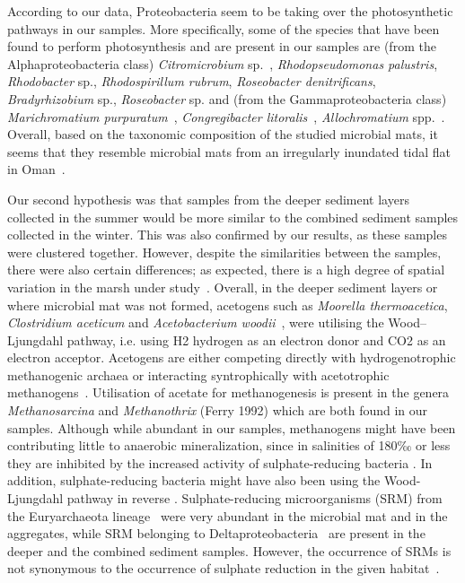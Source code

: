    According to our data, Proteobacteria seem to be taking over the photosynthetic pathways in our samples. 
   More specifically, some of the species that have been found to perform photosynthesis and are present in our samples are
   (from the Alphaproteobacteria class) \textit{Citromicrobium} sp.~\citep{jiao_coexistence_2010}, 
   \textit{Rhodopseudomonas palustris}, \textit{Rhodobacter} sp., \textit{Rhodospirillum rubrum}, 
   \textit{Roseobacter denitrificans}, \textit{Bradyrhizobium} sp., \textit{Roseobacter} sp. 
   \citep{larimer_complete_2004, bryant_prokaryotic_2006}
   and (from the Gammaproteobacteria class) 
   \textit{Marichromatium purpuratum}~\citep{shiung_photosynthetic_2018}, 
   \textit{Congregibacter litoralis}~\citep{fuchs_characterization_2007, spring_photosynthetic_2009}, 
   \textit{Allochromatium} spp.~\citep{kyndt_genome_2020}. 
   Overall, based on the taxonomic composition of the studied microbial mats, 
   it seems that they resemble microbial mats from an irregularly inundated tidal flat in Oman~\citep{meier_limitation_2021}.


   Our second hypothesis was that samples from the deeper sediment layers collected in the summer would be more similar to 
   the combined sediment samples collected in the winter. 
   This was also confirmed by our results, as these samples were clustered together. 
   However, despite the similarities between the samples, there were also certain differences; 
   as expected, there is a high degree of spatial variation in the marsh under study~\citep{dillon_spatial_2009}. 
   Overall, in the deeper sediment layers or where microbial mat was not formed, acetogens such as 
   \textit{Moorella thermoacetica}, \textit{Clostridium aceticum} and \textit{Acetobacterium woodii}~\citep{schuchmann_energetics_2016}, 
   were utilising the Wood–Ljungdahl pathway, i.e. using H2 hydrogen as an electron donor and CO2 as an electron acceptor. 
   Acetogens are either competing directly with hydrogenotrophic methanogenic archaea or interacting syntrophically 
   with acetotrophic methanogens~\citep{ragsdale_acetogenesis_2008}. 
   Utilisation of acetate for methanogenesis is present in the genera \textit{Methanosarcina} and \textit{Methanothrix} (Ferry 1992) 
   which are both found in our samples. 
   Although while abundant in our samples, methanogens might have been contributing little to anaerobic mineralization, 
   since in salinities of 180‰ or less they are inhibited by the increased activity of sulphate-reducing bacteria 
   \citep{sorensen_salinity_2004}. 
   In addition, sulphate-reducing bacteria might have also been using the Wood-Ljungdahl pathway in reverse 
   \citep{ragsdale_acetogenesis_2008}. 
   Sulphate-reducing microorganisms (SRM) from the Euryarchaeota lineage~\citep{muyzer_ecology_2008} were very abundant 
   in the microbial mat and in the aggregates, while SRM belonging to Deltaproteobacteria~\citep{muyzer_ecology_2008} 
   are present  in the deeper and the combined sediment samples. 
   However, the occurrence of SRMs is not synonymous to the occurrence of sulphate reduction in the given habitat~\citep{muyzer_ecology_2008}.

